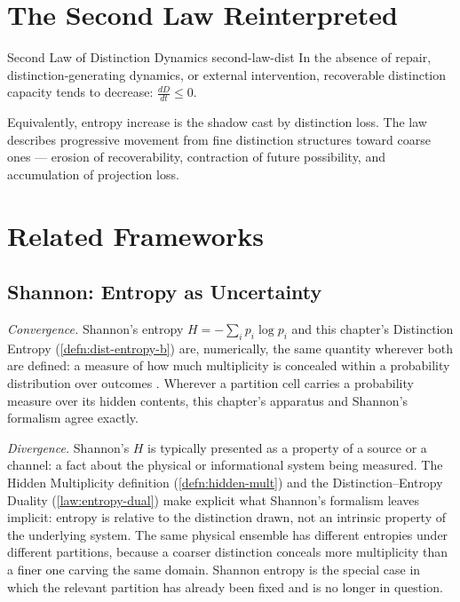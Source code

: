 \documentclass[12pt,twoside,openright]{book}
\begin{document}
\section{The Second Law Reinterpreted}
\label{sec:ch3-second}

\begin{law}{Second Law of Distinction Dynamics}%
  {second-law-dist}
  In the absence of repair, distinction-generating
  dynamics, or external intervention, recoverable
  distinction capacity tends to decrease:
  $\frac{dD}{dt} \le 0$.
\end{law}

Equivalently, entropy increase is the shadow cast by
distinction loss. The law describes progressive movement
from fine distinction structures toward coarse ones —
erosion of recoverability, contraction of future
possibility, and accumulation of projection loss.

\section{Related Frameworks}
\label{sec:ch3-related-frameworks}

\subsection*{Shannon: Entropy as Uncertainty}

\emph{Convergence.} Shannon's entropy
$H = -\sum_i p_i \log p_i$ and this chapter's Distinction
Entropy (\cref{defn:dist-entropy-b}) are, numerically, the same
quantity wherever both are defined: a measure of how much
multiplicity is concealed within a probability distribution
over outcomes \parencite{shannon1948,jaynes1957}. Wherever a
partition cell carries a probability measure over its hidden
contents, this chapter's apparatus and Shannon's formalism
agree exactly.

\emph{Divergence.} Shannon's $H$ is typically presented as a
property of a source or a channel: a fact about the physical or
informational system being measured. The Hidden Multiplicity
definition (\cref{defn:hidden-mult}) and the
Distinction--Entropy Duality (\cref{law:entropy-dual}) make
explicit what Shannon's formalism leaves implicit: entropy is
relative to the distinction drawn, not an intrinsic property of
the underlying system. The same physical ensemble has different
entropies under different partitions, because a coarser
distinction conceals more multiplicity than a finer one carving
the same domain. Shannon entropy is the special case in which
the relevant partition has already been fixed and is no longer
in question.
\end{document}

